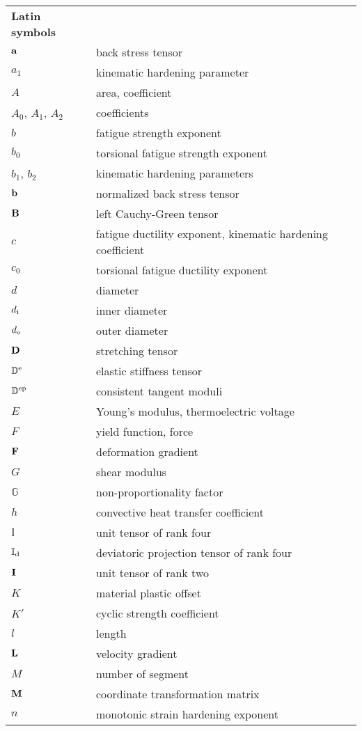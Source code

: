 \begin{table}[htb]
  \centering
    \begin{tabular}{p{3cm}p{10.5cm}}
    \textbf{Latin symbols} & \\
    $\bf{a}$ & back stress tensor \\
    $a_1$ & kinematic hardening parameter \\
    $A$ & area, coefficient \\
    $A_0$, $A_1$, $A_2$ & coefficients \\
    $b$ & fatigue strength exponent \\
    $b_0$ & torsional fatigue strength exponent \\
    $b_1$, $b_2$ & kinematic hardening parameters \\
    $\bf{b}$ & normalized back stress tensor \\
    $\bf{B}$ & left Cauchy-Green tensor \\
    $c$ & fatigue ductility exponent, kinematic hardening coefficient \\
    $c_0$ & torsional fatigue ductility exponent \\
    $d$  & diameter \\
    $d_{\rm i}$  & inner diameter \\
    $d_{\rm o}$  & outer diameter \\
    $\bf{D}$ & stretching tensor \\
    $\mathbb{D}^{\rm{e}}$ & elastic stiffness tensor \\
    $\mathbb{D}^{\rm{ep}}$ & consistent tangent moduli \\
    $E$   & Young's modulus, thermoelectric voltage \\
    $F$   & yield function, force \\
    $\bf{F}$ & deformation gradient \\
    $G$   & shear modulus \\
    $\mathbb{G}$ & non-proportionality factor \\
    $h$ & convective heat transfer coefficient \\
    $\mathbb{I}$ & unit tensor of rank four \\
    $\mathbb{I}_{\rm{d}}$ & deviatoric projection tensor of rank four \\
    $\bf{I}$ & unit tensor of rank two \\
    $K$ & material plastic offset \\
    $K'$ & cyclic strength coefficient \\
    $l$ & length \\
    $\bf{L}$ & velocity gradient \\
    $M$ & number of segment \\
    $\bf{M}$ & coordinate transformation matrix \\
    $n$ & monotonic strain hardening exponent \\
    \end{tabular}%
  \label{Tab:latin_1}%
\end{table}%

